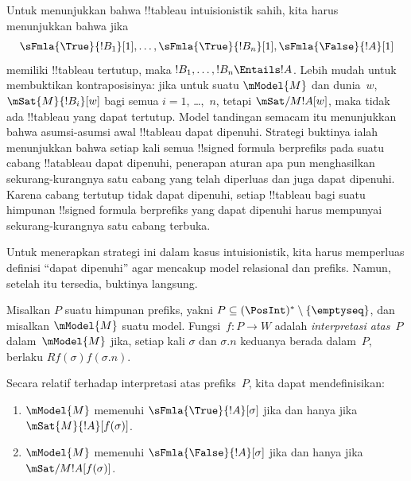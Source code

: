 \documentclass[../../../include/open-logic-section]{subfiles}
\begin{document}


\begin{explain}
  Untuk menunjukkan bahwa !!{tableau} intuisionistik sahih, kita harus
  menunjukkan bahwa jika
  \[
  \sFmla{\True}{!B_1}[1], \dots, \sFmla{\True}{!B_n}[1],
  \sFmla{\False}{!A}[1]
  \]
  memiliki !!{tableau} tertutup, maka
  $!B_1, \dots, !B_n \Entails !A$. Lebih mudah untuk membuktikan
  kontraposisinya: jika untuk suatu $\mModel{M}$ dan dunia~$w$,
  $\mSat{M}{!B_i}[w]$ bagi semua $i=1$, \dots,~$n$, tetapi
  $\mSat/{M}{!A}[w]$, maka tidak ada !!{tableau} yang dapat tertutup. Model
  tandingan semacam itu menunjukkan bahwa asumsi-asumsi awal !!{tableau}
  dapat dipenuhi. Strategi buktinya ialah menunjukkan bahwa setiap kali
  semua !!{signed formula} berprefiks pada suatu cabang !!a{tableau} dapat dipenuhi,
  penerapan aturan apa pun menghasilkan sekurang-kurangnya satu cabang yang
  telah diperluas dan juga dapat dipenuhi. Karena cabang tertutup tidak dapat
  dipenuhi, setiap !!{tableau} bagi suatu himpunan !!{signed formula}
  berprefiks yang
  dapat dipenuhi harus mempunyai sekurang-kurangnya satu cabang terbuka.

  Untuk menerapkan strategi ini dalam kasus intuisionistik, kita harus
  memperluas definisi ``dapat dipenuhi'' agar mencakup model relasional dan
  prefiks. Namun, setelah itu tersedia, buktinya langsung.
\end{explain}

\begin{defn}
  Misalkan $P$ suatu himpunan prefiks, yakni
  $P \subseteq (\PosInt)^* \setminus \{\emptyseq\}$, dan misalkan
  $\mModel{M}$ suatu model. Fungsi~$f\colon P \to W$ adalah
  \emph{interpretasi atas}~$P$ dalam~$\mModel{M}$ jika, setiap kali
  $\sigma$ dan $\sigma.n$ keduanya berada dalam~$P$, berlaku
  $Rf(\sigma)f(\sigma.n)$.

  Secara relatif terhadap interpretasi atas prefiks~$P$, kita dapat
  mendefinisikan:
  \begin{enumerate}
  \item $\mModel{M}$ memenuhi $\sFmla{\True}{!A}[\sigma]$ jika dan hanya jika
    $\mSat{M}{!A}[f(\sigma)]$.
  \item $\mModel{M}$ memenuhi $\sFmla{\False}{!A}[\sigma]$ jika dan hanya jika
    $\mSat/{M}{!A}[f(\sigma)]$.
  \end{enumerate}
\end{defn}
\end{document}
